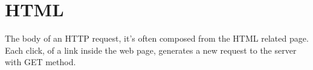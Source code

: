 \chapter{HTML}
The body of an HTTP request, it's often composed from the HTML related page. Each click, of a link inside the web page, generates a new request to the server with GET method.